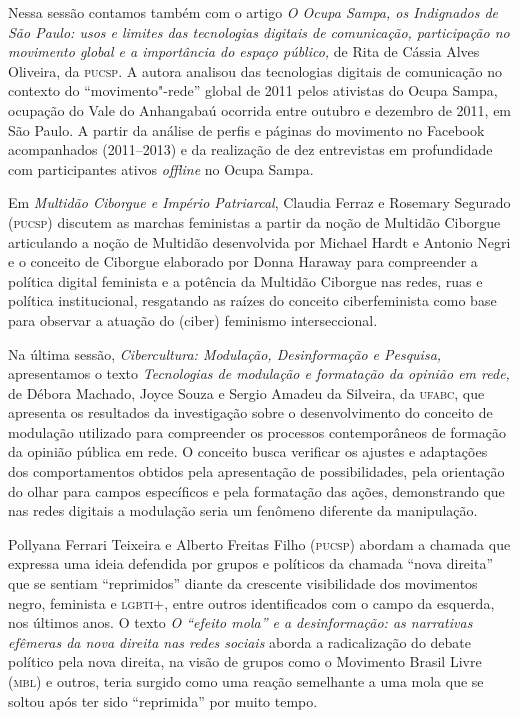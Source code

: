 Nessa sessão contamos também com o artigo \emph{O Ocupa Sampa, os
Indignados de São Paulo: usos e limites das tecnologias digitais de
comunicação, participação no movimento global e a importância do espaço
público,} de Rita de Cássia Alves Oliveira, da \textsc{pucsp}. A autora analisou
das tecnologias digitais de comunicação no contexto do
``movimento"-rede'' global de 2011 pelos ativistas do Ocupa Sampa,
ocupação do Vale do Anhangabaú ocorrida entre outubro e dezembro de
2011, em São Paulo. A partir da análise de perfis e páginas do movimento
no Facebook acompanhados (2011--2013) e da realização de dez entrevistas
em profundidade com participantes ativos \emph{offline} no Ocupa Sampa.

Em \emph{Multidão Ciborgue e Império Patriarcal}, Claudia Ferraz e
Rosemary Segurado (\textsc{pucsp}) discutem as marchas feministas a partir da
noção de Multidão Ciborgue articulando a noção de Multidão desenvolvida
por Michael Hardt e Antonio Negri e o conceito de Ciborgue elaborado por
Donna Haraway para compreender a política digital feminista e a
potência da Multidão Ciborgue nas redes, ruas e política institucional,
resgatando as raízes do conceito ciberfeminista como base para observar
a atuação do (ciber) feminismo interseccional.

Na última sessão, \emph{Cibercultura: Modulação, Desinformação e
Pesquisa,} apresentamos o texto \emph{Tecnologias de modulação e
formatação da opinião em rede,} de Débora Machado, Joyce Souza e Sergio
Amadeu da Silveira, da \textsc{ufabc}, que apresenta os resultados da
investigação sobre o desenvolvimento do conceito de modulação utilizado
para compreender os processos contemporâneos de formação da opinião
pública em rede. O conceito busca verificar os ajustes e adaptações dos
comportamentos obtidos pela apresentação de possibilidades, pela
orientação do olhar para campos específicos e pela formatação das ações,
demonstrando que nas redes digitais a modulação seria um fenômeno
diferente da manipulação.

Pollyana Ferrari Teixeira e Alberto Freitas Filho (\textsc{pucsp}) abordam a
chamada que expressa uma ideia defendida por grupos e políticos da
chamada ``nova direita'' que se sentiam ``reprimidos'' diante da
crescente visibilidade dos movimentos negro, feminista e \textsc{lgbti}+, entre
outros identificados com o campo da esquerda, nos últimos anos. O texto
\emph{O ``efeito mola'' e a desinformação: as narrativas efêmeras da
nova direita nas redes sociais} aborda a radicalização do debate
político pela nova direita, na visão de grupos como o Movimento Brasil
Livre (\textsc{mbl}) e outros, teria surgido como uma reação semelhante a uma
mola que se soltou após ter sido ``reprimida'' por muito tempo.


